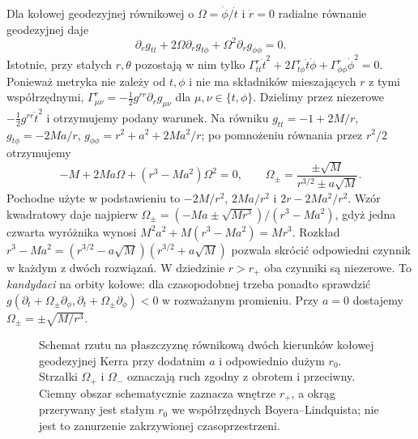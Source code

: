 \begin{przyklad}
Dla kołowej geodezyjnej równikowej o
$\Omega=\dot\phi/\dot t$ i $\dot r=0$
radialne równanie geodezyjnej daje
\[
 \partial_rg_{tt}+2\Omega\partial_rg_{t\phi}
                 +\Omega^2\partial_rg_{\phi\phi}=0.
\]
Istotnie, przy stałych $r,\theta$ pozostają w nim tylko
$\Gamma^r_{tt}\dot t^2
+2\Gamma^r_{t\phi}\dot t\dot\phi
+\Gamma^r_{\phi\phi}\dot\phi^2=0$.
Ponieważ metryka nie zależy od $t,\phi$ i nie ma
składników mieszających $r$ z tymi współrzędnymi,
$\Gamma^r_{\mu\nu}=-\tfrac12g^{rr}\partial_rg_{\mu\nu}$
dla $\mu,\nu\in\{t,\phi\}$.
Dzielimy przez niezerowe $-\tfrac12g^{rr}\dot t^2$
i otrzymujemy podany warunek.
Na równiku
$g_{tt}=-1+2M/r$,
$g_{t\phi}=-2Ma/r$,
$g_{\phi\phi}=r^2+a^2+2Ma^2/r$;
po pomnożeniu równania przez $r^2/2$
otrzymujemy
\[
 -M+2Ma\Omega+(r^3-Ma^2)\Omega^2=0,
 \qquad
 \Omega_\pm=\frac{\pm\sqrt M}{r^{3/2}\pm a\sqrt M}.
\]
Pochodne użyte w podstawieniu to
$-2M/r^2$, $2Ma/r^2$ i $2r-2Ma^2/r^2$.
Wzór kwadratowy daje najpierw
$\Omega_\pm=(-Ma\pm\sqrt{Mr^3})/(r^3-Ma^2)$,
gdyż jedna czwarta wyróżnika wynosi
$M^2a^2+M(r^3-Ma^2)=Mr^3$.
Rozkład
$r^3-Ma^2=(r^{3/2}-a\sqrt M)(r^{3/2}+a\sqrt M)$
pozwala skrócić odpowiedni czynnik w każdym z dwóch rozwiązań.
W dziedzinie $r>r_+$ oba czynniki są niezerowe.
To \emph{kandydaci} na orbity kołowe: dla
czasopodobnej trzeba ponadto sprawdzić
$g(\partial_t+\Omega_\pm\partial_\phi,
   \partial_t+\Omega_\pm\partial_\phi)<0$
w rozważanym promieniu. Przy $a=0$
dostajemy $\Omega_\pm=\pm\sqrt{M/r^3}$.
\end{przyklad}

\begin{figure}[htbp]
\centering
{}
\caption{Schemat rzutu na płaszczyznę równikową dwóch kierunków kołowej geodezyjnej Kerra przy dodatnim $a$ i odpowiednio dużym $r_0$. Strzałki $\Omega_+$ i $\Omega_-$ oznaczają ruch zgodny z obrotem i przeciwny. Ciemny obszar schematycznie zaznacza wnętrze $r_+$, a okrąg przerywany jest stałym $r_0$ we współrzędnych Boyera--Lindquista; nie jest to zanurzenie zakrzywionej czasoprzestrzeni.}
\label{fig:geodezyjna-kerr-kolowa}
\end{figure}

